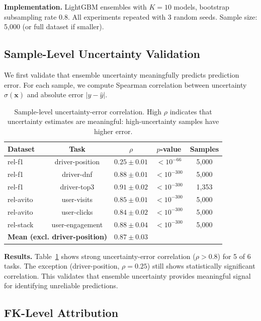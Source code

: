 \documentclass{article}
\begin{document}
\textbf{Implementation.} LightGBM ensembles with $K=10$ models, bootstrap subsampling
rate 0.8. All experiments repeated with 3 random seeds. Sample size: 5,000 (or full
dataset if smaller).

\subsection{Sample-Level Uncertainty Validation}

We first validate that ensemble uncertainty meaningfully predicts prediction error.
For each sample, we compute Spearman correlation between uncertainty $\sigma(\mathbf{x})$
and absolute error $|y - \hat{y}|$.

\begin{table}[t]
\centering
\caption{Sample-level uncertainty-error correlation. High $\rho$ indicates that
uncertainty estimates are meaningful: high-uncertainty samples have higher error.}
\label{tab:uncertainty}
\begin{tabular}{lcccc}
\toprule
Dataset & Task & $\rho$ & $p$-value & Samples \\
\midrule
rel-f1 & driver-position & $0.25 \pm 0.01$ & $< 10^{-66}$ & 5,000 \\
rel-f1 & driver-dnf & $0.88 \pm 0.01$ & $< 10^{-300}$ & 5,000 \\
rel-f1 & driver-top3 & $0.91 \pm 0.02$ & $< 10^{-300}$ & 1,353 \\
rel-avito & user-visits & $0.85 \pm 0.01$ & $< 10^{-300}$ & 5,000 \\
rel-avito & user-clicks & $0.84 \pm 0.02$ & $< 10^{-300}$ & 5,000 \\
rel-stack & user-engagement & $0.88 \pm 0.04$ & $< 10^{-300}$ & 5,000 \\
\midrule
\multicolumn{2}{l}{\textbf{Mean (excl. driver-position)}} & $0.87 \pm 0.03$ & & \\
\bottomrule
\end{tabular}
\end{table}

\textbf{Results.} Table~\ref{tab:uncertainty} shows strong uncertainty-error correlation
($\rho > 0.8$) for 5 of 6 tasks. The exception (driver-position, $\rho = 0.25$) still
shows statistically significant correlation. This validates that ensemble uncertainty
provides meaningful signal for identifying unreliable predictions.

\subsection{FK-Level Attribution}
\end{document}
